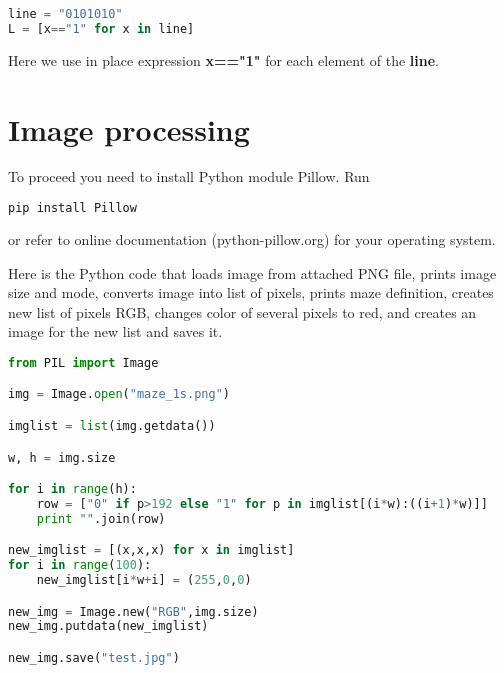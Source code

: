 \begin{lstlisting}[language=Python,style=codelst2,caption={Python: string element by element}]
line = "0101010"
L = [x=="1" for x in line]
\end{lstlisting}
Here we use in place expression \textbf{x=="1"} 
for each element of the \textbf{line}.

\section{Image processing}

To proceed you need to install Python module Pillow. Run

\begin{lstlisting}[language=bash,frame=single]
pip install Pillow
\end{lstlisting}
or refer to online documentation (python-pillow.org) for your
operating system.

Here is the Python code that loads image from attached PNG file,
prints image size and mode,
converts image into list of pixels, prints maze definition,
creates new list of pixels RGB, changes color of several pixels
to red, and creates an image for the new list and saves it.

\begin{lstlisting}[language=Python,style=codelst,caption={Python: image operations}]
from PIL import Image

img = Image.open("maze_1s.png")

imglist = list(img.getdata())

w, h = img.size

for i in range(h):
    row = ["0" if p>192 else "1" for p in imglist[(i*w):((i+1)*w)]]
    print "".join(row)

new_imglist = [(x,x,x) for x in imglist]
for i in range(100):
    new_imglist[i*w+i] = (255,0,0)

new_img = Image.new("RGB",img.size)
new_img.putdata(new_imglist)

new_img.save("test.jpg")
\end{lstlisting}

